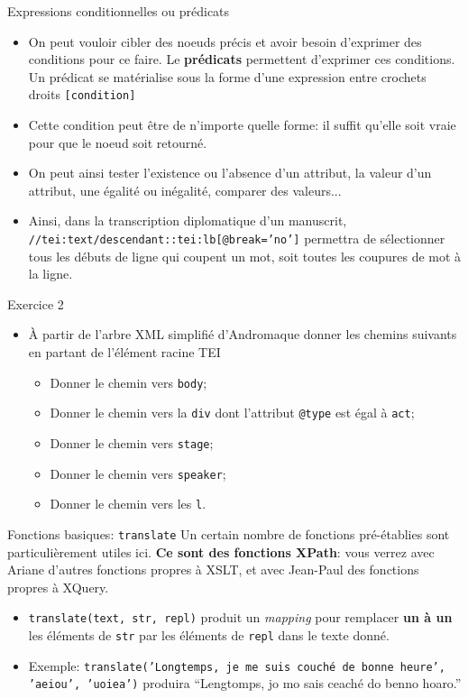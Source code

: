 \documentclass[11pt,aspectratio=169]{beamer}
\begin{document}
\begin{frame}{Expressions conditionnelles ou prédicats}
\begin{itemize}
\item On peut vouloir cibler des noeuds précis et avoir besoin d'exprimer des conditions pour ce faire. Le \textbf{prédicats} permettent d'exprimer ces conditions. Un prédicat se matérialise sous la forme d'une expression entre crochets droits \texttt{[condition]}
\item Cette condition peut être de n'importe quelle forme: il suffit qu'elle soit vraie pour que le noeud soit retourné.
\item On peut ainsi tester l'existence ou l'absence d'un attribut, la valeur d'un attribut, une égalité ou inégalité, comparer des valeurs...
\item Ainsi, dans la transcription diplomatique d'un manuscrit, \texttt{//tei:text/descendant::tei:lb[@break='no']} permettra de sélectionner tous les débuts de ligne qui coupent un mot, soit toutes les coupures de mot à la ligne.
\end{itemize}
\end{frame}



\begin{frame}{Exercice 2}
\begin{itemize}
\item À partir de l’arbre XML simplifié d’Andromaque donner les chemins suivants en partant de l’élément racine TEI
\begin{itemize}
\item Donner le chemin vers \texttt{body};
\item Donner le chemin vers la \texttt{div} dont l'attribut \texttt{@type} est égal à \texttt{act};
\item Donner le chemin vers \texttt{stage};
\item Donner le chemin vers \texttt{speaker};
\item Donner le chemin vers les \texttt{l}.
\end{itemize}
\end{itemize}
\end{frame}



\begin{frame}{Fonctions basiques: \texttt{translate}}
Un certain nombre de fonctions pré-établies sont particulièrement utiles ici. \textbf{Ce sont des fonctions XPath}: vous verrez avec Ariane d'autres fonctions propres à XSLT, et avec Jean-Paul des fonctions propres à XQuery.
\begin{itemize}
\item \texttt{translate(text, str, repl)} produit un \textit{mapping} pour remplacer \textbf{un à un} les éléments de \texttt{str} par les éléments de \texttt{repl} dans le texte donné. 
\item Exemple: \texttt{translate('Longtemps, je me suis couché de bonne heure', 'aeiou', 'uoiea')} produira \enquote{Lengtomps, jo mo sais ceaché do benno hoaro.}
\end{itemize}
\end{frame}
\end{document}
